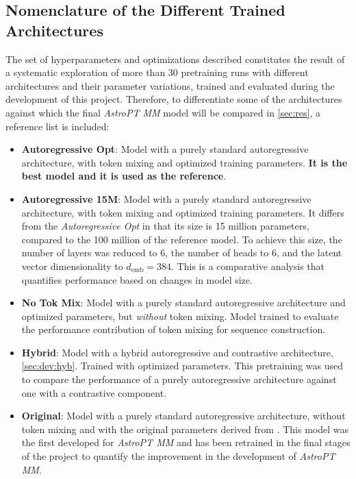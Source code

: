 \subsection{Nomenclature of the Different Trained Architectures} \label{sec:dev:names}

The set of hyperparameters and optimizations described constitutes the result of a systematic exploration of more than 30 pretraining runs with different architectures and their parameter variations, trained and evaluated during the development of this project. Therefore, to differentiate some of the architectures against which the final \textit{AstroPT MM} model will be compared in \cref{sec:res}, a reference list is included:

\begin{itemize}
	\item \textbf{Autoregressive Opt}: Model with a purely standard autoregressive architecture, with token mixing and optimized training parameters. \textbf{It is the best model and it is used as the reference}.
	
	\item \textbf{Autoregressive 15M}: Model with a purely standard autoregressive architecture, with token mixing and optimized training parameters. It differs from the \textit{Autoregressive Opt} in that its size is 15 million parameters, compared to the 100 million of the reference model. To achieve this size, the number of layers was reduced to 6, the number of heads to 6, and the latent vector dimensionality to $d_{\text{emb}} = 384$. This is a comparative analysis that quantifies performance based on changes in model size.
	
	\item \textbf{No Tok Mix}: Model with a purely standard autoregressive architecture and optimized parameters, but \emph{without} token mixing. Model trained to evaluate the performance contribution of token mixing for sequence construction.
	
	\item \textbf{Hybrid}: Model with a hybrid autoregressive and contrastive architecture, \cref{sec:dev:hyb}. Trained with optimized parameters. This pretraining was used to compare the performance of a purely autoregressive architecture against one with a contrastive component.
	
	\item \textbf{Original}: Model with a purely standard autoregressive architecture, without token mixing and with the original parameters derived from \textcite{ar:astropt}. This model was the first developed for \textit{AstroPT MM} and has been retrained in the final stages of the project to quantify the improvement in the development of \textit{AstroPT MM}.
	

\end{itemize}
